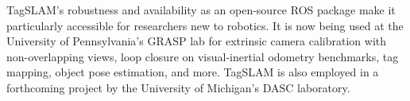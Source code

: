 TagSLAM's robustness and
availability as an open-source ROS \cite{quigley2009} package make it
particularly accessible for researchers new to robotics. It is now
being used at the University of Pennsylvania's GRASP lab for extrinsic
camera calibration with non-overlapping views, loop closure on
visual-inertial odometry benchmarks, tag mapping, object pose
estimation, and more. TagSLAM is also employed in a forthcoming
project by the University of Michigan's DASC laboratory.
